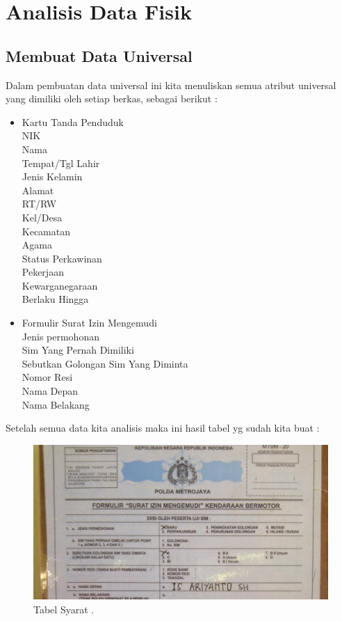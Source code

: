 \chapter{Analisis Data Fisik}

\section{Membuat Data Universal}
Dalam pembuatan data universal ini kita menuliskan semua atribut universal yang dimiliki oleh setiap berkas, sebagai berikut :
\begin{itemize}

	\item Kartu Tanda Penduduk\\
		NIK\\
		Nama\\
		Tempat/Tgl Lahir\\
		Jenis Kelamin\\
		Alamat\\
		RT/RW\\
		Kel/Desa\\
		Kecamatan\\
		Agama\\
		Status Perkawinan\\
		Pekerjaan\\
		Kewarganegaraan\\
		Berlaku Hingga\\
	
		
	\item Formulir Surat Izin Mengemudi\\
		Jenis permohonan\\
		Sim Yang Pernah Dimiliki\\
		Sebutkan Golongan Sim Yang Diminta\\
		Nomor Resi\\
		Nama Depan\\
		Nama Belakang\\


\end{itemize}
Setelah semua data kita analisis maka ini hasil tabel yg sudah kita buat :

\begin{figure}[H]
	\centering
	\includegraphics[width=12cm]{figures/syarat.jpg}
	\caption{Tabel Syarat .}	
\end{figure}